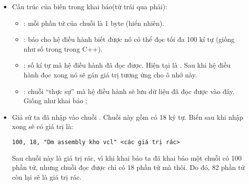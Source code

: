 \documentclass[main.tex]{subfiles}
\begin{document}
\begin{itemize}
    \item Cấu trúc của biến  trong khai báo(từ trái qua phải):
    \begin{itemize}
        \item {}: mỗi phần tử của chuỗi là 1 byte (hiển nhiên).
        \item {}: báo cho hệ điều hành biết được nó có thể đọc tối đa 100 kí tự (giống như số  trong  trong C++).
        \item {}: số kí tự mà hệ điều hành đã đọc được. Hiện tại là . Sau khi hệ điều hành đọc xong nó sẽ gán giá trị tương ứng cho ô nhớ này.
        \item {}: chuỗi ``thực sự'' mà hệ điều hành sẽ lưu dữ liệu đã đọc được vào đây. Giống như khai báo ;
    \end{itemize}
    \item Giả sử ta đã nhập vào chuỗi . Chuỗi này gồm có 18 ký tự. Biến  sau khi nhập xong sẽ có giá trị là:
    \begin{verbatim}
100, 18, "Dm assembly kho vcl" <các giá trị rác>
    \end{verbatim} 
    \par Sau chuỗi này là giá trị rác, vì khi khai báo ta đã khai báo một chuỗi có 100 phần tử, nhưng chuỗi đọc được chỉ có 18 phần tử mà thôi. Do đó, 82 phần tử còn lại sẽ là giá trị rác.
\end{itemize}
\end{document}
